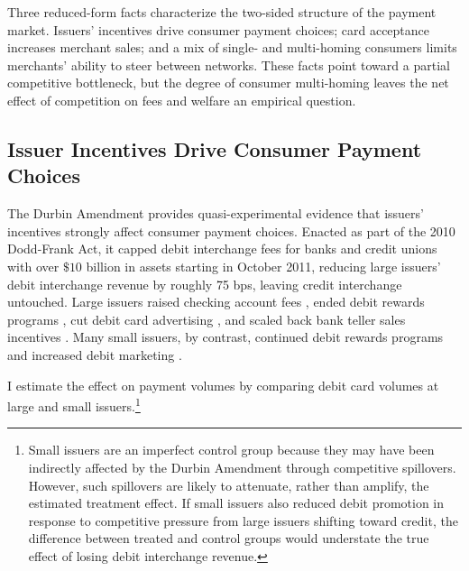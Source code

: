\documentclass[main.tex]{subfiles}
\begin{document}
Three reduced-form facts characterize the two-sided structure of the payment market.
Issuers' incentives drive consumer payment choices; card acceptance increases merchant sales; and a mix of single- and multi-homing consumers limits merchants' ability to steer between networks.
These facts point toward a partial competitive bottleneck, but the degree of consumer multi-homing leaves the net effect of competition on fees and welfare an empirical question.

\subsection{Issuer Incentives Drive Consumer Payment Choices\label{subsec:durbin-reduced-form}}

The Durbin Amendment provides quasi-experimental evidence that issuers' incentives strongly affect consumer payment choices.
Enacted as part of the 2010 Dodd-Frank Act, it capped debit interchange fees for banks and credit unions with over $\$10$ billion in assets starting in October 2011, reducing large issuers' debit interchange revenue by roughly 75 bps, leaving credit interchange untouched.
Large issuers raised checking account fees \parencite{Kay.etal2018,Mukharlyamov.Sarin2025}, ended debit rewards programs \parencite{Hayashi2012, Schneider.Borra2015}, cut debit card advertising \parencite{Hayashi2012}, and scaled back bank teller sales incentives \parencite{Johnson2010}.
Many small issuers, by contrast, continued debit rewards programs and increased debit marketing \parencite{CUOnline2012, Orem2016}.

I estimate the effect on payment volumes by comparing debit card volumes at large and small issuers.\footnote{\label{fn:durbin-control-group}Small issuers are an imperfect control group because they may have been indirectly affected by the Durbin Amendment through competitive spillovers. However, such spillovers are likely to attenuate, rather than amplify, the estimated treatment effect. If small issuers also reduced debit promotion in response to competitive pressure from large issuers shifting toward credit, the difference between treated and control groups would understate the true effect of losing debit interchange revenue.}
\end{document}
